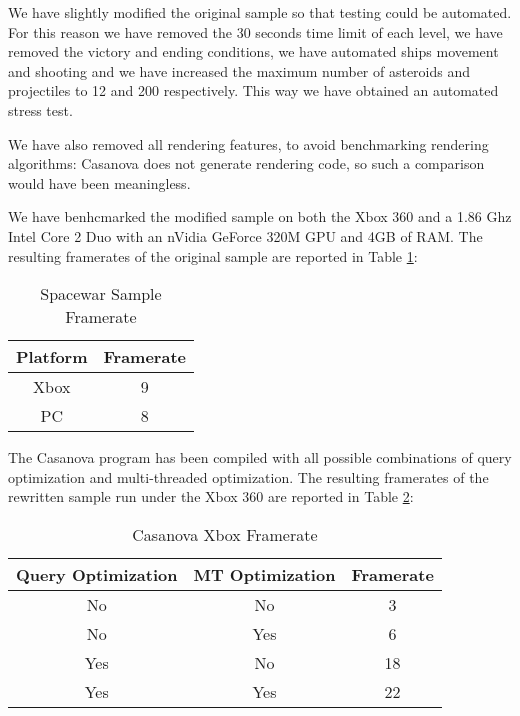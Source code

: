 
We have slightly modified the original sample so that testing could be automated. For this reason we have removed the 30 seconds time limit of each level, we have removed the victory and ending conditions, we have automated ships movement and shooting and we have increased the maximum number of asteroids and projectiles to 12 and 200 respectively. This way we have obtained an automated stress test.

We have also removed all rendering features, to avoid benchmarking rendering algorithms: Casanova does not generate rendering code, so such a comparison would have been meaningless.

We have benhcmarked the modified sample on both the Xbox 360 and a 1.86 Ghz Intel Core 2 Duo with an nVidia GeForce 320M GPU and 4GB of RAM. The resulting framerates of the original sample are reported in Table \ref{table:reference_fps}:

\begin{table}[ht] 
\center
\begin{tabular}{|cc|} 
\hline
Platform & Framerate \\ 
\hline
Xbox & 9 \\
PC & 8 \\
\hline
\end{tabular} 
\caption{Spacewar Sample Framerate}
\label{table:reference_fps}
\end{table}

The Casanova program has been compiled with all possible combinations of query optimization and multi-threaded optimization. The resulting framerates of the rewritten sample run under the Xbox 360 are reported in Table \ref{table:xbox_fps}:

\begin{table}[ht] 
\center
\begin{tabular}{|ccc|} 
\hline
Query Optimization & MT Optimization & Framerate \\ 
\hline
No & No & 3 \\
No & Yes & 6 \\
Yes & No & 18 \\
Yes & Yes & 22 \\
\hline
\end{tabular} 
\caption{Casanova Xbox Framerate}
\label{table:xbox_fps}
\end{table}


